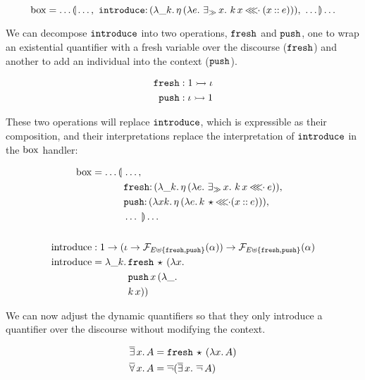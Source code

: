 $$
\BOX = \ldots \banana{\ldots,\ \onto{\op{introduce}}{(\lam{\_ k}{\etaE{(\lam{e}{\existsr x.\ \ap{k}{x} \apll (x \cons e)})}})},\ \ldots} \ldots
$$

We can decompose $\mathtt{introduce}$ into two operations, $\mathtt{fresh}$ and
$\mathtt{push}$, one to wrap an existential quantifier with a fresh variable
over the discourse ($\mathtt{fresh}$) and another to add an individual into the
context ($\mathtt{push}$).

\begin{align*}
  \mathtt{fresh} &: 1 \rightarrowtail \iota \\
  \mathtt{push} &: \iota \rightarrowtail 1
\end{align*}

These two operations will replace $\mathtt{introduce}$, which is expressible as
their composition, and their interpretations replace the interpretation of
$\mathtt{introduce}$ in the $\mathrm{box}$ handler:

\begin{align*}
  \BOX &= \ldots \lban\begin{aligned}[t]
      &\ldots, \\
      &\onto{\op{fresh}}{(\lam{\_ k}{\etaE{(\lam{e}{\existsr x.\ \ap{k}{x} \apll e})}})}, \\
      &\onto{\op{push}}{(\lam{x k}{\etaE{(\lam{e}{\ap{k}{\star} \apll (x \cons e)})}})}, \\
      &\ldots\ \rban \ldots
    \end{aligned} \\
  \\
  \introduce &: 1 \to (\iota \to \FF_{E \uplus \{\op{fresh},
               \op{push}\}}(\alpha)) \to \FF_{E \uplus \{\op{fresh},
               \op{push}\}}(\alpha) \\
  \introduce &= \lam{\_ k}{\begin{aligned}[t]
      &\app{\op{fresh}}{\star}{(\lam{x}{ \\
      &\app{\op{push}}{x}{(\lam{\_}{ \\
      &\ap{k}{x}})}})}
    \end{aligned}}
\end{align*}

We can now adjust the dynamic quantifiers so that they only introduce a
quantifier over the discourse without modifying the context.

\begin{align*}
  \mathop{\overline{\exists}} x.\,A &= \mathtt{fresh}\,\star\,(\lambda x.\, A) \\
  \mathop{\overline{\forall}} x.\,A &= \mathop{\overline{\lnot}} (\mathop{\overline{\exists}} x.\,\mathop{\overline{\lnot}} A)
\end{align*}

